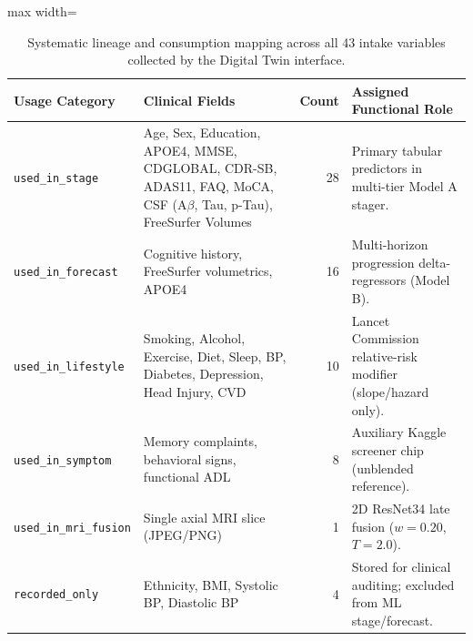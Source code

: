 \begin{table}[t]
\centering
\caption{Systematic lineage and consumption mapping across all 43 intake variables collected by the Digital Twin interface.}
\label{tab:lineage_summary}
\small
\begin{adjustbox}{max width=\linewidth}
\begin{tabular}{lp{3.8cm}rp{5.2cm}}
\toprule
\textbf{Usage Category} & \textbf{Clinical Fields} & \textbf{Count} & \textbf{Assigned Functional Role} \\
\midrule
\texttt{used\_in\_stage} & Age, Sex, Education, APOE4, MMSE, CDGLOBAL, CDR-SB, ADAS11, FAQ, MoCA, CSF ($\text{A}\beta$, Tau, p-Tau), FreeSurfer Volumes & 28 & Primary tabular predictors in multi-tier Model A stager. \\
\texttt{used\_in\_forecast} & Cognitive history, FreeSurfer volumetrics, APOE4 & 16 & Multi-horizon progression delta-regressors (Model B). \\
\texttt{used\_in\_lifestyle} & Smoking, Alcohol, Exercise, Diet, Sleep, BP, Diabetes, Depression, Head Injury, CVD & 10 & Lancet Commission relative-risk modifier (slope/hazard only). \\
\texttt{used\_in\_symptom} & Memory complaints, behavioral signs, functional ADL & 8 & Auxiliary Kaggle screener chip (unblended reference). \\
\texttt{used\_in\_mri\_fusion} & Single axial MRI slice (JPEG/PNG) & 1 & 2D ResNet34 late fusion ($w=0.20$, $T=2.0$). \\
\texttt{recorded\_only} & Ethnicity, BMI, Systolic BP, Diastolic BP & 4 & Stored for clinical auditing; excluded from ML stage/forecast. \\
\bottomrule
\end{tabular}
\end{adjustbox}
\end{table}
